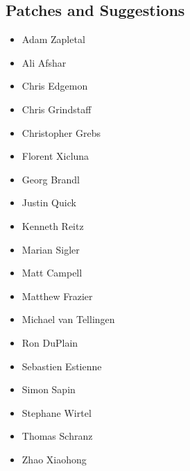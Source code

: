 \documentclass[a4paper,12pt]{sphinxmanual}
\begin{document}
\subsection{Patches and Suggestions}
\label{license:patches-and-suggestions}\begin{itemize}
\item {} 
Adam Zapletal

\item {} 
Ali Afshar

\item {} 
Chris Edgemon

\item {} 
Chris Grindstaff

\item {} 
Christopher Grebs

\item {} 
Florent Xicluna

\item {} 
Georg Brandl

\item {} 
Justin Quick

\item {} 
Kenneth Reitz

\item {} 
Marian Sigler

\item {} 
Matt Campell

\item {} 
Matthew Frazier

\item {} 
Michael van Tellingen

\item {} 
Ron DuPlain

\item {} 
Sebastien Estienne

\item {} 
Simon Sapin

\item {} 
Stephane Wirtel

\item {} 
Thomas Schranz

\item {} 
Zhao Xiaohong

\end{itemize}
\end{document}
